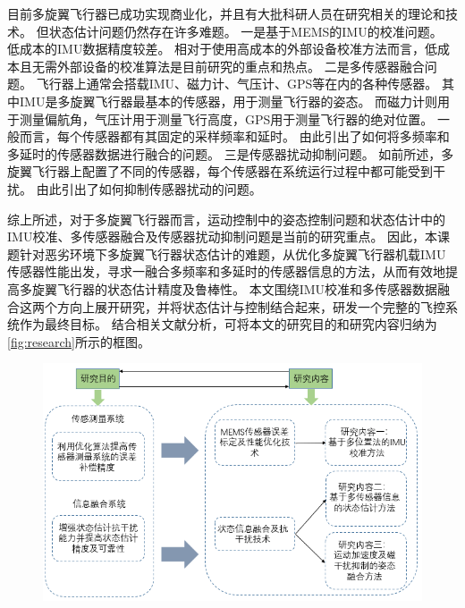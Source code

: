\documentclass[
  type=master
]{gdutthesis}
\begin{document}
目前多旋翼飞行器已成功实现商业化，并且有大批科研人员在研究相关的理论和技术\cite{李一博2019微小型飞行器视觉感知与自主导航关键技术研究,cao2015inner,mechali2022fixed}。
但状态估计问题仍然存在许多难题。
一是基于MEMS的IMU的校准问题。
低成本的IMU数据精度较差。
相对于使用高成本的外部设备校准方法而言，低成本且无需外部设备的校准算法是目前研究的重点和热点。
二是多传感器融合问题。
飞行器上通常会搭载IMU、磁力计、气压计、GPS等在内的各种传感器。
其中IMU是多旋翼飞行器最基本的传感器，用于测量飞行器的姿态。
而磁力计则用于测量偏航角，气压计用于测量飞行高度，GPS用于测量飞行器的绝对位置。
一般而言，每个传感器都有其固定的采样频率和延时。
由此引出了如何将多频率和多延时的传感器数据进行融合的问题。
三是传感器扰动抑制问题。
如前所述，多旋翼飞行器上配置了不同的传感器，每个传感器在系统运行过程中都可能受到干扰。
由此引出了如何抑制传感器扰动的问题。

综上所述，对于多旋翼飞行器而言，运动控制中的姿态控制问题和状态估计中的IMU校准、多传感器融合及传感器扰动抑制问题是当前的研究重点。
因此，本课题针对恶劣环境下多旋翼飞行器状态估计的难题，从优化多旋翼飞行器机载IMU传感器性能出发，寻求一融合多频率和多延时的传感器信息的方法，从而有效地提高多旋翼飞行器的状态估计精度及鲁棒性。
本文围绕IMU校准和多传感器数据融合这两个方向上展开研究，并将状态估计与控制结合起来，研发一个完整的飞控系统作为最终目标。
结合相关文献分析\cite{王勇军2021融合多源信息的小型多旋翼无人机位姿估计方法研究}，可将本文的研究目的和研究内容归纳为\autoref{fig:research}所示的框图。
\begin{figure}[H]
	\centering
	\includegraphics[width=1.0\textwidth]{屏幕截图 2022-06-08 091435.png}
	\label{fig:research}
\end{figure}
\end{document}
